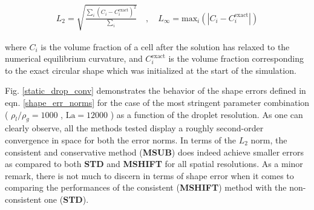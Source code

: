 \begin{align}
	L_2 = \sqrt{\frac{\sum_i \left(C_i - C_i^\text{exact} \right)^2}{\sum_i}} \quad , \quad L_\infty = \text{max}_i \left( | C_i - C_i^\text{exact} | \right)
  \label{shape_err_norms}
\end{align}

where $C_i$ is the volume fraction of a cell after the solution has relaxed to the numerical equilibrium curvature, and $C_i^\text{exact}$ is the volume fraction corresponding to the exact circular shape which was initialized at the start of the simulation.  

Fig. \ref{static_drop_conv} demonstrates the behavior of the shape errors defined in eqn. \ref{shape_err_norms} for the case of the most stringent parameter combination ( $\rho_l / \rho_g = 1000 $ , $\textrm{La} = 12000$ ) as a function of the droplet resolution. As one can clearly observe, all the methods tested display a roughly second-order convergence in space for both the error norms. In terms of the $L_2$ norm, the consistent and conservative method (\textbf{MSUB}) does indeed achieve smaller errors as compared to both \textbf{STD} and \textbf{MSHIFT} for all spatial resolutions. As a minor remark, there is not much to discern in terms of shape error when it comes to comparing the performances of the consistent (\textbf{MSHIFT}) method with the non-consistent one (\textbf{STD}). 

